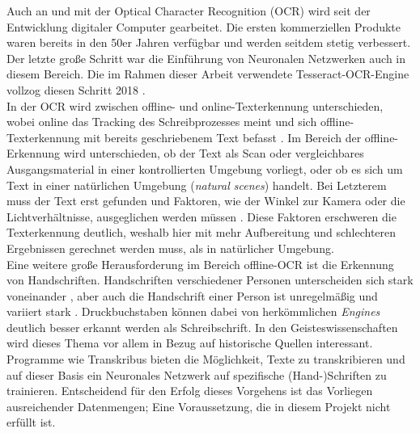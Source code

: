 Auch an und mit der Optical Character Recognition (OCR) wird seit der Entwicklung digitaler Computer gearbeitet. Die ersten kommerziellen Produkte waren bereits in den 50er Jahren verfügbar \cite{eikvil}{} und werden seitdem stetig verbessert. Der letzte große Schritt war die Einführung von Neuronalen Netzwerken auch in diesem Bereich. Die im Rahmen dieser Arbeit verwendete Tesseract-OCR-Engine vollzog diesen Schritt 2018  \cite{tesseractrelease}{}.\\
In der OCR wird zwischen offline- und online-Texterkennung unterschieden, wobei online das Tracking des Schreibprozesses meint und sich offline-Texterkennung mit bereits geschriebenem Text befasst \cite{feldmann}{}. Im Bereich der offline-Erkennung wird unterschieden, ob der Text als Scan oder vergleichbares Ausgangsmaterial in einer kontrollierten Umgebung vorliegt, oder ob es sich um Text in einer natürlichen Umgebung (\textit{natural scenes}{}) handelt. Bei Letzterem muss der Text erst gefunden und Faktoren, wie der Winkel zur Kamera oder die Lichtverhältnisse, ausgeglichen werden müssen  \cite{forsberg}{} \cite{qixiangye}{} \cite{xilinchen}. Diese Faktoren erschweren die Texterkennung deutlich, weshalb hier mit mehr Aufbereitung und schlechteren Ergebnissen gerechnet werden muss, als in natürlicher Umgebung.\\
Eine weitere große Herausforderung im Bereich offline-OCR ist die Erkennung von Handschriften. Handschriften verschiedener Personen unterscheiden sich stark voneinander  \cite{sumedhahallale}, aber auch die Handschrift einer Person ist unregelmäßig und variiert stark \cite{feldmann}. Druckbuchstaben können dabei von herkömmlichen \textit{Engines}{} deutlich besser erkannt werden als Schreibschrift. In den Geisteswissenschaften wird dieses Thema vor allem in Bezug auf historische Quellen interessant. Programme wie Transkribus \cite{transkribus}{} bieten die Möglichkeit, Texte zu transkribieren und auf dieser Basis ein Neuronales Netzwerk auf spezifische (Hand-)Schriften zu trainieren. Entscheidend für den Erfolg dieses Vorgehens ist das Vorliegen ausreichender Datenmengen; Eine Voraussetzung, die in diesem Projekt nicht erfüllt ist. 



